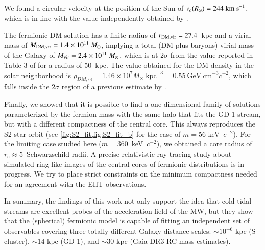 \documentclass[twocolumn]{aa}
\begin{document}
We found a circular velocity at the position of the Sun of $v_c(R_\odot)= 244~\rm{km~s}^{-1}$, which is in line with the value independently obtained by \citet{2019MNRAS.486.2995M}.

The fermionic DM solution has a finite radius of $r_{\rm{DM,vir}}=27.4$~kpc and a virial mass of
$M_{\rm{DM,vir}}=1.4\times10^{11}~M_\odot$, implying a total (DM plus baryons) virial mass of the Galaxy of $M_{\rm{vir}}= 2.4\times10^{11}~M_\odot$, which is at $2\sigma$ from the value reported in Table 3 of
\citet{2014MNRAS.445.3788G} for a radius of 50~kpc. The value obtained for the DM density in the solar neighborhood is $\rho_{DM,\odot}=1.46\times10^7M_\odot~\mathrm{kpc}^{-3}=0.55~\mathrm{GeV}~\mathrm{cm}^{-3} c^{-2}$, which falls inside the $2\sigma$ region of a previous estimate by \citet{Salucci2010}.

Finally, we showed that it is possible to find a one-dimensional family of solutions parameterized by the fermion mass with the same halo that fits the GD-1 stream, but with a different compactness of the central core. This always reproduces the S2 star orbit (see \cref{fig:S2_fit,fig:S2_fit_b} for the case of $m=56$ keV~$c^{-2}$). For the limiting case studied here ($m=360$~keV~$c^{-2}$), we obtained a core radius of $r_\mathrm{c}\approx5$~Schwarzschild radii.
A precise relativistic ray-tracing study about simulated ring-like images of the central
cores of fermionic distributions is in progress. We try to place strict constraints on the minimum
compactness needed for an agreement with the EHT observations.


In summary, the findings of this work not only support the idea that cold tidal streams are excellent probes of the acceleration field of the MW, but they show that the (spherical) fermionic model is capable of fitting an independent set of observables covering three totally different Galaxy distance scales: $\sim 10^{-6}$ kpc (S-cluster), $\sim 14$ kpc (GD-1), and $\sim 30$ kpc (Gaia DR3 RC mass estimates).


\end{document}
